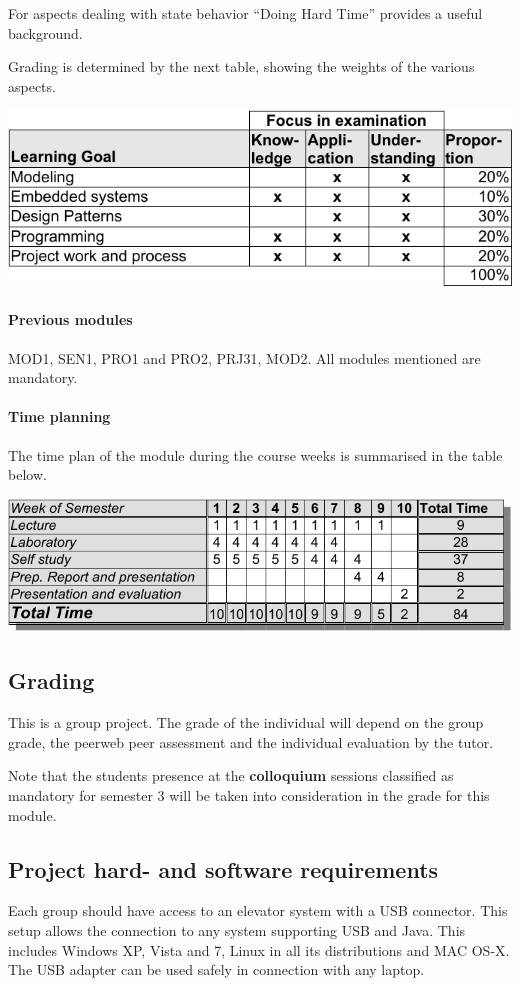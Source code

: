 For aspects dealing with state behavior ``Doing Hard Time'' \citep{DHT} provides a useful
background. 

Grading is determined by the next table, showing the weights of the various aspects.

\includegraphics{tables/learninggoals-crop.pdf}


\paragraph{Previous modules} MOD1, SEN1, PRO1 and PRO2, PRJ31, MOD2.
All modules mentioned are mandatory.

\paragraph{Time planning} The time plan of the module during the
course weeks is summarised in the table below.

\includegraphics{tables/timetable-crop.pdf}


\subsection{Grading}
This is a group project. The grade of the individual will depend on
the group grade, the peerweb peer assessment and the individual
evaluation by the tutor.

Note that the students presence at the \textbf{colloquium} sessions classified as
mandatory for semester 3 will be taken into consideration in the grade
for this module.

\subsection{Project hard- and software requirements}
Each group should have access to an elevator system with a USB
connector. This setup allows the connection to any system supporting
USB and Java. This includes Windows XP, Vista and 7, Linux in all its
distributions and MAC OS-X. The USB adapter can be used safely in
connection with any laptop.


